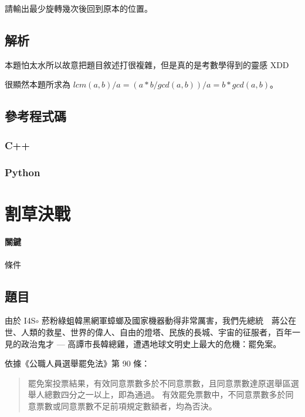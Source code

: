 \documentclass[a4paper,10pt]{article}
\begin{document}
請輸出最少旋轉幾次後回到原本的位置。

\subsection{解析}

本題怕太水所以故意把題目敘述打很複雜，但是真的是考數學得到的靈感 XDD

很顯然本題所求為 $lcm(a, b) / a = (a * b / gcd(a, b)) / a = b * gcd(a, b)$。

\subsection{參考程式碼}

\subsubsection{C++}



\subsubsection{Python}



\section{割草決戰}

\paragraph{關鍵} 條件

\subsection{題目}

由於 I4S$\circ$ 菸粉綠蛆韓黑網軍蟑螂及國家機器動得非常厲害，我們先總統　蔣公在世、人類的救星、世界的偉人、自由的燈塔、民族的長城、宇宙的征服者，百年一見的政治鬼才 --- 高譚市長韓總雞，遭遇地球文明史上最大的危機：罷免案。

依據《公職人員選舉罷免法》第 90 條：
\begin{quote}
罷免案投票結果，有效同意票數多於不同意票數，且同意票數達原選舉區選舉人總數四分之一以上，即為通過。
有效罷免票數中，不同意票數多於同意票數或同意票數不足前項規定數額者，均為否決。
\end{quote}
\end{document}
